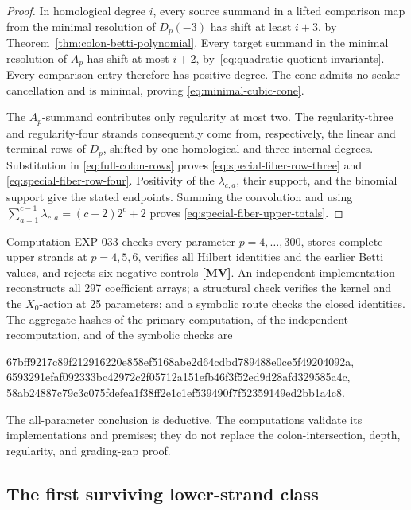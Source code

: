 \documentclass[11pt]{article}
\theoremstyle{definition}
\theoremstyle{remark}
\begin{document}
\begin{proof}
In homological degree \(i\), every source summand in a lifted comparison map from the minimal
resolution of \(D_p(-3)\) has shift at least \(i+3\), by
Theorem~\ref{thm:colon-betti-polynomial}. Every target summand in the minimal resolution of \(A_p\)
has shift at most \(i+2\), by~\eqref{eq:quadratic-quotient-invariants}. Every comparison entry
therefore has positive degree. The cone admits no scalar cancellation and is minimal, proving
\eqref{eq:minimal-cubic-cone}.

The \(A_p\)-summand contributes only regularity at most two. The regularity-three and
regularity-four strands consequently come from, respectively, the linear and terminal rows of
\(D_p\), shifted by one homological and three internal degrees. Substitution in
\eqref{eq:full-colon-rows} proves \eqref{eq:special-fiber-row-three} and
\eqref{eq:special-fiber-row-four}. Positivity of the \(\lambda_{c,a}\), their support, and the
binomial support give the stated endpoints. Summing the convolution and using
\(\sum_{a=1}^{c-1}\lambda_{c,a}=(c-2)2^c+2\) proves
\eqref{eq:special-fiber-upper-totals}.
\end{proof}

Computation EXP-033 checks every parameter \(p=4,\ldots,300\), stores complete upper strands at
\(p=4,5,6\), verifies all Hilbert identities and the earlier Betti values, and rejects six
negative controls \textbf{[MV]}. An independent implementation reconstructs all 297 coefficient
arrays; a structural check verifies the kernel and the \(X_0\)-action at 25 parameters; and a
symbolic route checks the closed identities. The aggregate hashes of the primary computation, of
the independent recomputation, and of the symbolic checks are
\begin{center}
{\fontsize{7}{8}\selectfont\ttfamily 67bff9217c89f212916220e858ef5168abe2d64cdbd789488e0ce5f49204092a},\\
{\fontsize{7}{8}\selectfont\ttfamily 6593291efaf092333bc42972c2f05712a151efb46f3f52ed9d28afd329585a4c},\\
{\fontsize{7}{8}\selectfont\ttfamily 58ab24887c79c3c075fdefea1f38ff2e1c1ef539490f7f52359149ed2bb1a4c8}.
\end{center}
The all-parameter conclusion is deductive. The computations validate its implementations and
premises; they do not replace the colon-intersection, depth, regularity, and grading-gap proof.

\subsection{The first surviving lower-strand class}
\end{document}
